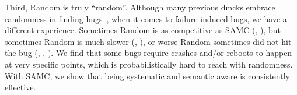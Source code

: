 Third, Random is truly ``random''.  Although many previous dmcks
embrace randomness in finding bugs~\cite{Killian+07-LifeDeathMaceMC,
  Yang+09-Modist}, when it comes to failure-induced bugs, we have a
different experience.  Sometimes Random is as competitive as SAMC
(\eg, ), but sometimes Random is much slower (\eg,
), or worse Random sometimes did not hit the bug (\eg,
, ).  We find that some bugs require crashes
and/or reboots to happen at very specific points, which is
probabilistically hard to reach with randomness.  With SAMC, we show
that being systematic and semantic aware is consistently effective.

